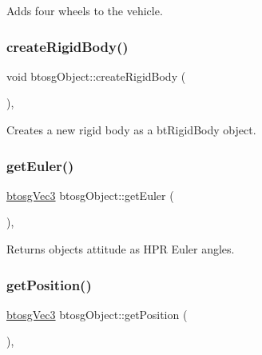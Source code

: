 Adds four wheels to the vehicle. \mbox{\label{classbtosgObject_a029dbe9134fa94e7355799f67fb2cd6d}} 
\subsubsection{\texorpdfstring{createRigidBody()}{createRigidBody()}}
{\footnotesize\ttfamily void btosg\+Object\+::create\+Rigid\+Body (\begin{DoxyParamCaption}{ }\end{DoxyParamCaption})\hspace{0.3cm}{\ttfamily [inline]}, {\ttfamily [inherited]}}

Creates a new rigid body as a bt\+Rigid\+Body object. \mbox{\label{classbtosgObject_a2019ec63bde02b72600450c7c985e77a}} 
\subsubsection{\texorpdfstring{getEuler()}{getEuler()}}
{\footnotesize\ttfamily \mbox{\hyperlink{classbtosgVec3}{btosg\+Vec3}} btosg\+Object\+::get\+Euler (\begin{DoxyParamCaption}{ }\end{DoxyParamCaption})\hspace{0.3cm}{\ttfamily [inline]}, {\ttfamily [inherited]}}

Returns object\textquotesingle{}s attitude as H\+PR Euler angles. \mbox{\label{classbtosgObject_a3dadd5da8f2a312e44a039446b93d4cd}} 
\subsubsection{\texorpdfstring{getPosition()}{getPosition()}}
{\footnotesize\ttfamily \mbox{\hyperlink{classbtosgVec3}{btosg\+Vec3}} btosg\+Object\+::get\+Position (\begin{DoxyParamCaption}{ }\end{DoxyParamCaption})\hspace{0.3cm}{\ttfamily [inline]}, {\ttfamily [inherited]}}

